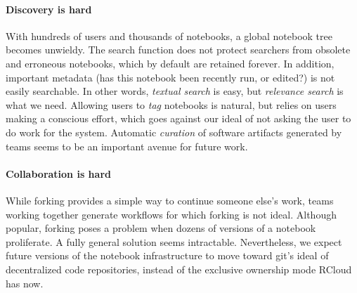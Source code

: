 


\paragraph*{Discovery is hard} 
With hundreds of users and thousands of notebooks, a global notebook tree
becomes unwieldy. The search function does not protect searchers from
obsolete and erroneous notebooks, which by default are retained
forever. In addition, important metadata (has this notebook been
recently run, or edited?) is not easily searchable. In other words,
\emph{textual search} is easy, but \emph{relevance search} is what we
need. Allowing users to \emph{tag} notebooks is natural, but
relies on users making a conscious effort, which goes against
our ideal of not asking the user to do work for the system.
Automatic
\emph{curation} of
software artifacts generated by teams seems to be an important avenue
for future work.

\paragraph*{Collaboration is hard}
While forking provides a simple way to continue someone else's work,
teams working together generate workflows for which forking is not
ideal. Although popular, forking poses a problem when dozens of
versions of a notebook proliferate. A fully general solution seems
intractable. Nevertheless, we expect future versions of the
notebook infrastructure to move toward git's ideal of decentralized
code repositories, instead of the exclusive ownership mode RCloud has now.
